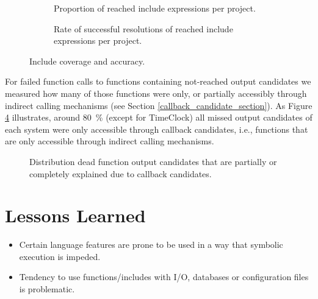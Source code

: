 \documentclass{sig-alternate-05-2015}
\begin{document}
\begin{figure}[t!]
    \centering
    \begin{subfigure}[t]{0.5 \textwidth}    	
        \centering        
				
        \caption{Proportion of reached include expressions per project.}
        \label{include_coverage_results1}
    \end{subfigure}%
	\hfill
    \begin{subfigure}[t]{0.5\textwidth}    
        \centering
                
        \caption{Rate of successful resolutions of reached include expressions
        per project.}
        \label{include_coverage_results2}
    \end{subfigure}
    \label{include_coverage_results}
    \caption{Include coverage and accuracy.}
\end{figure}


For failed function calls to functions containing not-reached output candidates we measured how many of those functions were only, or partially accessibly through indirect calling mechanisms (see Section \ref{callback_candidate_section}). As Figure \ref{output_candidate_explanation} illustrates, around 80~\% (except for TimeClock) all missed output candidates of each system were only accessible through callback candidates, i.e., functions that are only accessible through indirect calling mechanisms.

\begin{figure}
	
	\caption{Distribution dead function output candidates that are partially or
	completely explained due to callback candidates.}
	\label{output_candidate_explanation}
\end{figure}

\section{Lessons Learned}
\begin{itemize}
  \item Certain language features are prone to be used in a way that symbolic
  execution is impeded.
  \item Tendency to use functions/includes with I/O, databases or configuration
  files is problematic.
\end{itemize}
\end{document}
